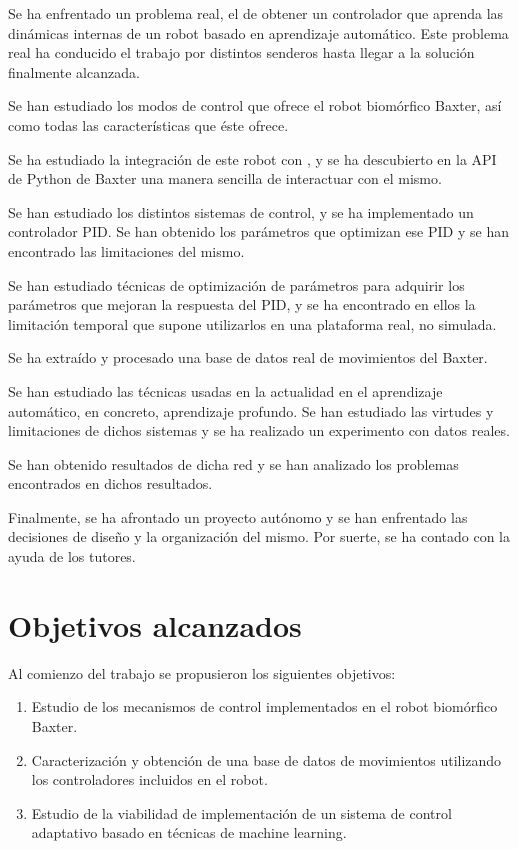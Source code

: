 Se ha enfrentado un problema real, el de obtener un controlador que aprenda las dinámicas internas de un robot basado en aprendizaje automático. Este problema real ha conducido el trabajo por distintos senderos hasta llegar a la solución finalmente alcanzada.

Se han estudiado los modos de control que ofrece el robot biomórfico Baxter, así como todas las características que éste ofrece.

Se ha estudiado la integración de este robot con \ros, y se ha descubierto en la API de Python de Baxter una manera sencilla de interactuar con el mismo.

Se han estudiado los distintos sistemas de control, y se ha implementado un controlador PID. Se han obtenido los parámetros que optimizan ese PID y se han encontrado las limitaciones del mismo.

Se han estudiado técnicas de optimización de parámetros para adquirir los parámetros que mejoran la respuesta del PID, y se ha encontrado en ellos la limitación temporal que supone utilizarlos en una plataforma real, no simulada.

Se ha extraído y procesado una base de datos real de movimientos del Baxter.

Se han estudiado las técnicas usadas en la actualidad en el aprendizaje automático, en concreto, aprendizaje profundo. Se han estudiado las virtudes y limitaciones de dichos sistemas y se ha realizado un experimento con datos reales.

Se han obtenido resultados de dicha red y se han analizado los problemas encontrados en dichos resultados.

Finalmente, se ha afrontado un proyecto autónomo y se han enfrentado las decisiones de diseño y la organización del mismo. Por suerte, se ha contado con la ayuda de los tutores.
\section{Objetivos alcanzados}
Al comienzo del trabajo se propusieron los siguientes objetivos:

\begin{enumerate}
	\item Estudio de los mecanismos de control implementados en el robot biomórfico Baxter.
	\item Caracterización y obtención de una base de datos de movimientos utilizando los controladores incluidos en el robot.
	\item Estudio de la viabilidad de implementación de un sistema de control adaptativo basado en técnicas de machine learning.
\end{enumerate}

